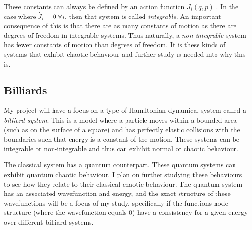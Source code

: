 \documentclass[12pt,a4paper]{amsart}
\begin{document}

These constants can always be defined by an action function $J_{i}(q, p)$ \cite{HILBORN}. In the case where $\dot{J_{i}} = 0 \ \forall i$, then that system is called \textit{integrable}. An important consequence of this is that there are as many constants of motion as there are degrees of freedom in integrable systems. Thus naturally, a \textit{non-integrable} system has fewer constants of motion than degrees of freedom. It is these kinds of systems that exhibit chaotic behaviour and further study is needed into why this is.

 

\subsection{Billiards}

My project will have a focus on a type of Hamiltonian dynamical system called a \textit{billiard system}. This is a model where a particle moves within a bounded area (such as on the surface of a square) and has perfectly elastic collisions with the boundaries such that energy is a constant of the motion. These systems can be integrable or non-integrable and thus can exhibit normal or chaotic behaviour. 

The classical system has a quantum counterpart. These quantum systems can exhibit quantum chaotic behaviour. I plan on further studying these behaviours to see how they relate to their classical chaotic behaviour. The quantum system has an associated wavefunction and energy, and the exact structure of these wavefunctions will be a focus of my study, specifically if the functions node structure (where the wavefunction equals 0) have a consistency for a given energy over different billiard systems.

\end{document}
